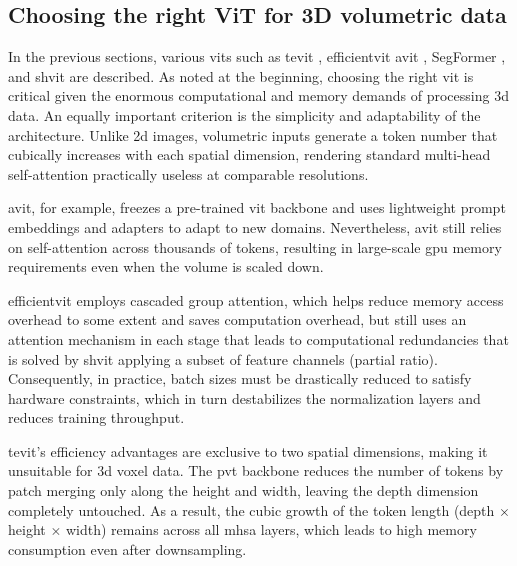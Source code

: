 
\subsection{Choosing the right ViT for 3D volumetric data}
In the previous sections, various \glspl{vit} such as \gls{tevit} \cite{yang2022temporallyefficientvisiontransformer}, \gls{efficientvit} \cite{liu2023efficientvitmemoryefficientvision} \gls{avit} \cite{du2024avitadaptingvisiontransformers}, SegFormer \cite{xie2021segformersimpleefficientdesign}, and \gls{shvit} \cite{yun2024shvit} are described. As noted at the beginning, choosing the right \gls{vit} is critical given the enormous computational and memory demands of processing \gls{3d} data. An equally important criterion is the simplicity and adaptability of the architecture. Unlike \gls{2d} images, volumetric inputs generate a token number that cubically increases with each spatial dimension, rendering standard multi-head self-attention practically useless at comparable resolutions.

\medskip

\gls{avit}, for example, freezes a pre-trained \gls{vit} backbone and uses lightweight prompt embeddings and adapters to adapt to new domains. Nevertheless, \gls{avit} still relies on self-attention across thousands of tokens, resulting in large-scale \gls{gpu} memory requirements even when the volume is scaled down.

\medskip

\gls{efficientvit} employs cascaded group attention, which helps reduce memory access overhead to some extent and saves computation overhead, but still uses an attention mechanism in each stage that leads to computational redundancies that is solved by \gls{shvit} applying a subset of feature channels (partial ratio). Consequently, in practice, batch sizes must be drastically reduced to satisfy hardware constraints, which in turn destabilizes the normalization layers and reduces training throughput.

\medskip

\gls{tevit}'s efficiency advantages are exclusive to two spatial dimensions, making it unsuitable for \gls{3d} voxel data. The \gls{pvt} backbone reduces the number of tokens by patch merging only along the height and width, leaving the depth dimension completely untouched. As a result, the cubic growth of the token length (depth $\times$ height $\times$ width) remains across all \gls{mhsa} layers, which leads to high memory consumption even after downsampling.

